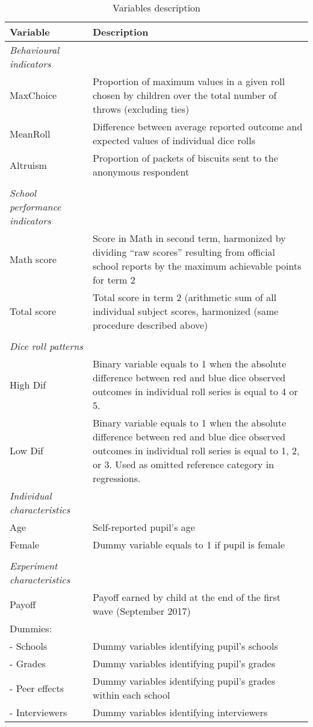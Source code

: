 \begin{table}[!h]\centering \caption{Variables description}
\renewcommand*{\arraystretch}{1}
\begin{tabular}{l p{9.5cm}}\toprule
\textbf{Variable} 			& \textbf{Description} 			\\ \midrule
\textit{Behavioural indicators} & \\
MaxChoice 					& Proportion of maximum values in a given roll chosen by children over the total number of throws (excluding ties)						\\
MeanRoll 					& Difference between average reported outcome and expected values of individual dice rolls	\\
Altruism 					& Proportion of packets of biscuits sent to the anonymous respondent						\\
&\\
\textit{School performance indicators} & \\
Math score					& Score in Math in second term, harmonized by dividing \enquote{raw scores} resulting from official school reports by the maximum achievable points for term 2 \\
Total score					& Total score in term 2 (arithmetic sum of all individual subject scores, harmonized (same procedure described above) \\
&\\ \midrule
\textit{Dice roll patterns} & \\
High Dif 					& Binary variable equals to 1 when the absolute difference between red and blue dice observed outcomes in individual roll series is equal to 4 or 5. \\
Low Dif					& Binary variable equals to 1 when the absolute difference between red and blue dice observed outcomes in individual roll series is equal to 1, 2, or 3. Used as omitted reference category in regressions. \\
\textit{Individual characteristics}&			\\
Age 		 				& Self-reported pupil's age								\\
Female 						& Dummy variable equals to 1 if pupil is female	\\
&\\
\textit{Experiment characteristics}&			\\
Payoff                      & Payoff earned by child at the end of the first wave (September 2017) \\
Dummies: & \\
- Schools              & Dummy variables identifying pupil's schools \\
- Grades              & Dummy variables identifying pupil's grades \\
- Peer effects  & Dummy variables identifying pupil's grades within each school \\
- Interviewers         & Dummy variables identifying interviewers \\
\bottomrule
\end{tabular} 
\label{tab:description}
\end{table}

